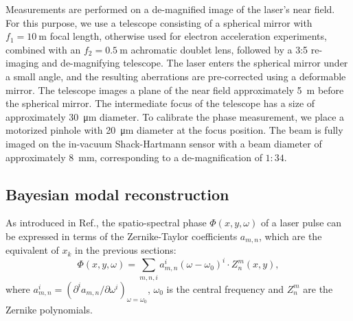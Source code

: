\documentclass[9pt, twocolumn,superscriptaddress]{revtex4}
\begin{document}
Measurements are performed on a de-magnified image of the laser's near field. For this purpose, we use a telescope consisting of a spherical mirror with $f_1=\SI{10}{\metre}$ focal length, otherwise used for electron acceleration experiments, combined with an $f_2=\SI{0.5}{\metre}$ achromatic doublet lens, followed by a 3:5 re-imaging and de-magnifying telescope. The laser enters the spherical mirror under a small angle, and the resulting aberrations are pre-corrected using a deformable mirror. The telescope images a plane of the near field approximately \SI{5}{\metre} before the spherical mirror. The intermediate focus of the telescope has a size of approximately \SI{30}{\micro\metre} diameter. To calibrate the phase measurement, we place a motorized pinhole with \SI{20}{\micro\metre} diameter at the focus position. The beam is fully imaged on the in-vacuum Shack-Hartmann sensor with a beam diameter of approximately \SI{8}{mm}, corresponding to a de-magnification of $1:34$. 




\subsection{Bayesian modal reconstruction}\label{sec:modal}

As introduced in Ref.\cite{weisse2023b}, the spatio-spectral phase $\Phi(x,y,\omega)$ of a laser pulse can be expressed in terms of the Zernike-Taylor coefficients $a_{m,n}$, which are the equivalent of $x_k$ in the previous sections:
\begin{equation}
    \Phi(x,y,\omega) = \sum_{m,n,i}  a_{m,n}^i(\omega-\omega_0)^i \cdot Z_n^m(x,y),
    \label{eq:spatio-spectral-phase}
\end{equation}
where $a_{m,n}^i = \left({\partial^i a_{m,n}}/{\partial \omega
^i}\right)_{\omega = \omega_0}$, $\omega_0$ is the central frequency and $Z_n^m$ are the Zernike polynomials.
\end{document}
